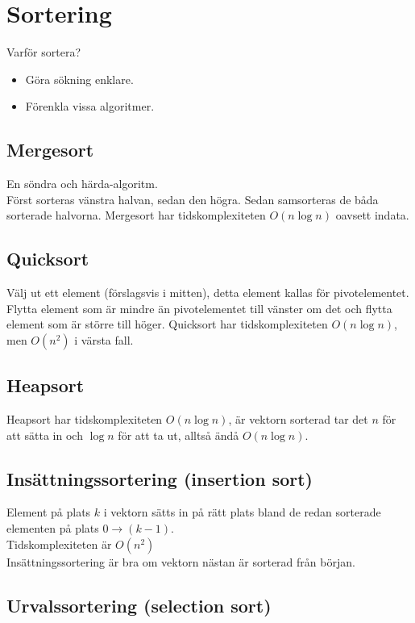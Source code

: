 \documentclass[11pt]{article}
\begin{document}
\section{Sortering}
Varför sortera?
\begin{itemize}
\item{Göra sökning enklare.}
\item{Förenkla vissa algoritmer.}
\end{itemize}
\subsection{Mergesort}
En söndra och härda-algoritm. \\
Först sorteras vänstra halvan, sedan den högra. Sedan samsorteras de båda sorterade halvorna.
Mergesort har tidskomplexiteten $O(n \log n)$ oavsett indata.
\subsection{Quicksort}
Välj ut ett element (förslagsvis i mitten), detta element kallas för pivotelementet. \\
Flytta element som är mindre än pivotelementet till vänster om det och flytta element som är större till höger. 
Quicksort har tidskomplexiteten $O(n \log n)$, men $O(n^2)$ i värsta fall.
\subsection{Heapsort}
Heapsort har tidskomplexiteten $O(n \log n)$, är vektorn sorterad tar det $n$ för att sätta in och $\log n$ för att ta ut, alltså ändå $O(n \log n)$.
\subsection{Insättningssortering (insertion sort)}
Element på plats $k$ i vektorn sätts in på rätt plats bland de redan sorterade elementen på plats $0 \rightarrow(k-1)$. \\
Tidskomplexiteten är $O(n^2)$ \\
Insättningssortering är bra om vektorn nästan är sorterad från början. 
\subsection{Urvalssortering (selection sort)}
\end{document}
